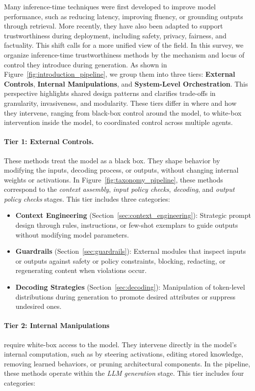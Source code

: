 Many inference-time techniques were first developed to improve model performance, such as reducing latency, improving fluency, or grounding outputs through retrieval. More recently, they have also been adapted to support trustworthiness during deployment, including safety, privacy, fairness, and factuality. This shift calls for a more unified view of the field. In this survey, we organize inference-time trustworthiness methods by the mechanism and locus of control they introduce during generation. As shown in Figure~\ref{fig:introduction_pipeline}, we group them into three tiers: \textbf{External Controls}, \textbf{Internal Manipulations}, and \textbf{System-Level Orchestration}. This perspective highlights shared design patterns and clarifies trade-offs in granularity, invasiveness, and modularity. These tiers differ in where and how they intervene, ranging from black-box control around the model, to white-box intervention inside the model, to coordinated control across multiple agents.

\paragraph{Tier 1: External Controls.} These methods treat the model as a black box. They shape behavior by modifying the inputs, decoding process, or outputs, without changing internal weights or activations. In Figure~\ref{fig:taxonomy_pipeline}, these methods correspond to the \emph{context assembly}, \emph{input policy checks}, \emph{decoding}, and \emph{output policy checks} stages. This tier includes three categories:

\begin{itemize}
\item \textbf{Context Engineering} (Section~\ref{sec:context_engineering}): Strategic prompt design through rules, instructions, or few-shot exemplars to guide outputs without modifying model parameters.
\item \textbf{Guardrails} (Section~\ref{sec:guardrails}): External modules that inspect inputs or outputs against safety or policy constraints, blocking, redacting, or regenerating content when violations occur.
\item \textbf{Decoding Strategies} (Section~\ref{sec:decoding}): Manipulation of token-level distributions during generation to promote desired attributes or suppress undesired ones.
\end{itemize}

\paragraph{Tier 2: Internal Manipulations} require white-box access to the model. They intervene directly in the model's internal computation, such as by steering activations, editing stored knowledge, removing learned behaviors, or pruning architectural components. In the pipeline, these methods operate within the \emph{LLM generation} stage. This tier includes four categories:


